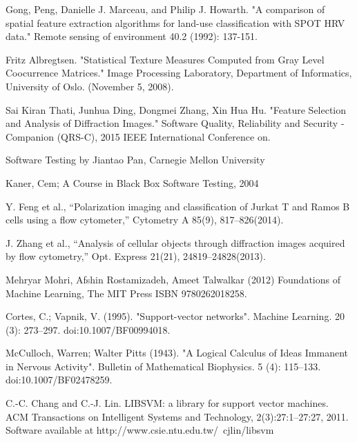 \begin{thebibliography}{99}
Gong, Peng, Danielle J. Marceau, and Philip J. Howarth. "A comparison of spatial feature extraction algorithms for land-use classification with SPOT HRV data." Remote sensing of environment 40.2 (1992): 137-151.

Fritz Albregtsen. "Statistical Texture Measures Computed from Gray Level Coocurrence Matrices." Image Processing Laboratory, Department of Informatics, University of Oslo. (November 5, 2008).

Sai Kiran Thati, Junhua Ding, Dongmei Zhang, Xin Hua Hu. "Feature Selection and Analysis of Diffraction Images." Software Quality, Reliability and Security - Companion (QRS-C), 2015 IEEE International Conference on.

Software Testing by Jiantao Pan, Carnegie Mellon University

Kaner, Cem; A Course in Black Box Software Testing, 2004

Y. Feng et al., “Polarization imaging and classification of Jurkat T and Ramos B cells using a flow cytometer,” Cytometry A 85(9), 817–826(2014).

J. Zhang et al., “Analysis of cellular objects through diffraction images acquired by flow cytometry,” Opt. Express 21(21), 24819–24828(2013).

Mehryar Mohri, Afshin Rostamizadeh, Ameet Talwalkar (2012) Foundations of Machine Learning, The MIT Press ISBN 9780262018258.

Cortes, C.; Vapnik, V. (1995). "Support-vector networks". Machine Learning. 20 (3): 273–297. doi:10.1007/BF00994018.

McCulloch, Warren; Walter Pitts (1943). "A Logical Calculus of Ideas Immanent in Nervous Activity". Bulletin of Mathematical Biophysics. 5 (4): 115–133. doi:10.1007/BF02478259.

C.-C. Chang and C.-J. Lin. LIBSVM: a library for support vector machines. ACM
Transactions on Intelligent Systems and Technology, 2(3):27:1–27:27, 2011. Software
available at http://www.csie.ntu.edu.tw/~cjlin/libsvm
\end{thebibliography}
